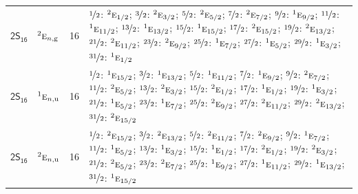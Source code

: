 \documentclass[10pt,a4paper]{article}
\numberwithin{equation}{section}
\newcommand{\grp}[1]{\mathsf{#1}}
\newcommand{\irr}[1]{\text{\normalfont\scshape #1}}
\newcommand{\conjpair}[1]{{}^{#1}}
\newcommand{\ptag}[1]{\mathrm{#1}}
\newlength{\fillwidth}\newlength{\cellwidth}\newlength{\colwidth}
\begin{document}
{\begin{longtable}{@{}llr>{\RaggedRight\arraybackslash}p{\fillwidth}@{}}
\href{2S16.pdf}{$\grp{2S_{16}}$} & $\conjpair{2}\irr{e}_{n,\ptag{g}}$ & 16 & $\nicefrac{1}{2}$: $\conjpair{2}\irr{e}_{1/2}$; $\nicefrac{3}{2}$: $\conjpair{2}\irr{e}_{3/2}$; $\nicefrac{5}{2}$: $\conjpair{2}\irr{e}_{5/2}$; $\nicefrac{7}{2}$: $\conjpair{2}\irr{e}_{7/2}$; $\nicefrac{9}{2}$: $\conjpair{1}\irr{e}_{9/2}$; $\nicefrac{11}{2}$: $\conjpair{1}\irr{e}_{11/2}$; $\nicefrac{13}{2}$: $\conjpair{1}\irr{e}_{13/2}$; $\nicefrac{15}{2}$: $\conjpair{1}\irr{e}_{15/2}$; $\nicefrac{17}{2}$: $\conjpair{2}\irr{e}_{15/2}$; $\nicefrac{19}{2}$: $\conjpair{2}\irr{e}_{13/2}$; $\nicefrac{21}{2}$: $\conjpair{2}\irr{e}_{11/2}$; $\nicefrac{23}{2}$: $\conjpair{2}\irr{e}_{9/2}$; $\nicefrac{25}{2}$: $\conjpair{1}\irr{e}_{7/2}$; $\nicefrac{27}{2}$: $\conjpair{1}\irr{e}_{5/2}$; $\nicefrac{29}{2}$: $\conjpair{1}\irr{e}_{3/2}$; $\nicefrac{31}{2}$: $\conjpair{1}\irr{e}_{1/2}$\\
\href{2S16.pdf}{$\grp{2S_{16}}$} & $\conjpair{1}\irr{e}_{n,\ptag{u}}$ & 16 & $\nicefrac{1}{2}$: $\conjpair{1}\irr{e}_{15/2}$; $\nicefrac{3}{2}$: $\conjpair{1}\irr{e}_{13/2}$; $\nicefrac{5}{2}$: $\conjpair{1}\irr{e}_{11/2}$; $\nicefrac{7}{2}$: $\conjpair{1}\irr{e}_{9/2}$; $\nicefrac{9}{2}$: $\conjpair{2}\irr{e}_{7/2}$; $\nicefrac{11}{2}$: $\conjpair{2}\irr{e}_{5/2}$; $\nicefrac{13}{2}$: $\conjpair{2}\irr{e}_{3/2}$; $\nicefrac{15}{2}$: $\conjpair{2}\irr{e}_{1/2}$; $\nicefrac{17}{2}$: $\conjpair{1}\irr{e}_{1/2}$; $\nicefrac{19}{2}$: $\conjpair{1}\irr{e}_{3/2}$; $\nicefrac{21}{2}$: $\conjpair{1}\irr{e}_{5/2}$; $\nicefrac{23}{2}$: $\conjpair{1}\irr{e}_{7/2}$; $\nicefrac{25}{2}$: $\conjpair{2}\irr{e}_{9/2}$; $\nicefrac{27}{2}$: $\conjpair{2}\irr{e}_{11/2}$; $\nicefrac{29}{2}$: $\conjpair{2}\irr{e}_{13/2}$; $\nicefrac{31}{2}$: $\conjpair{2}\irr{e}_{15/2}$\\
\href{2S16.pdf}{$\grp{2S_{16}}$} & $\conjpair{2}\irr{e}_{n,\ptag{u}}$ & 16 & $\nicefrac{1}{2}$: $\conjpair{2}\irr{e}_{15/2}$; $\nicefrac{3}{2}$: $\conjpair{2}\irr{e}_{13/2}$; $\nicefrac{5}{2}$: $\conjpair{2}\irr{e}_{11/2}$; $\nicefrac{7}{2}$: $\conjpair{2}\irr{e}_{9/2}$; $\nicefrac{9}{2}$: $\conjpair{1}\irr{e}_{7/2}$; $\nicefrac{11}{2}$: $\conjpair{1}\irr{e}_{5/2}$; $\nicefrac{13}{2}$: $\conjpair{1}\irr{e}_{3/2}$; $\nicefrac{15}{2}$: $\conjpair{1}\irr{e}_{1/2}$; $\nicefrac{17}{2}$: $\conjpair{2}\irr{e}_{1/2}$; $\nicefrac{19}{2}$: $\conjpair{2}\irr{e}_{3/2}$; $\nicefrac{21}{2}$: $\conjpair{2}\irr{e}_{5/2}$; $\nicefrac{23}{2}$: $\conjpair{2}\irr{e}_{7/2}$; $\nicefrac{25}{2}$: $\conjpair{1}\irr{e}_{9/2}$; $\nicefrac{27}{2}$: $\conjpair{1}\irr{e}_{11/2}$; $\nicefrac{29}{2}$: $\conjpair{1}\irr{e}_{13/2}$; $\nicefrac{31}{2}$: $\conjpair{1}\irr{e}_{15/2}$\\

\end{longtable}}
\end{document}
